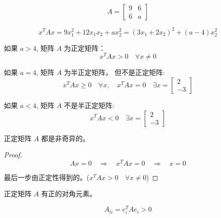 \begin{example}
    \begin{equation} A=\left[\begin{array}{ll}9 & 6 \\ 6 & a\end{array}\right] \end{equation}

    \begin{equation} x^{T} A x=9 x_{1}^{2}+12 x_{1} x_{2}+a x_{2}^{2}=\left(3 x_{1}+2 x_{2}\right)^{2}+(a-4) x_{2}^{2} \end{equation}

    如果 $ a>4 $, 矩阵 $ A $ 为正定矩阵：
\begin{equation}
x^{T} A x>0 \quad \forall x \neq 0
\end{equation}

如果 $ a=4 $, 矩阵 $ A $ 为半正定矩阵， 但不是正定矩阵:
\begin{equation}
x^{T} A x \geq 0 \quad \forall x, \quad x^{T} A x=0 \quad \exists x=\left[\begin{array}{l}
2 \\
-3
\end{array}\right]
\end{equation}

如果 $ a<4 $, 矩阵 $ A $ 不是半正定矩阵:
\begin{equation}
x^{T} A x<0 \quad \exists x=\left[\begin{array}{l}
2 \\
-3
\end{array}\right]
\end{equation}
\end{example}

\begin{theorem}
    正定矩阵 $ A $ 都是非奇异的。
\end{theorem}

\begin{proof}
    \begin{equation} A x=0 \quad \Rightarrow \quad x^{T} A x=0 \quad \Rightarrow \quad x=0 \end{equation}

    最后一步由正定性得到的。($
    x^{T} A x>0 \quad \forall x \neq 0
    $)

\end{proof}

\begin{theorem}[正定矩阵对角元素性质]
    正定矩阵 $ A $ 有正的对角元素。

    \begin{equation}
A_{i i}=e_{i}^{T} A e_{i}>0
\end{equation}
\end{theorem}

